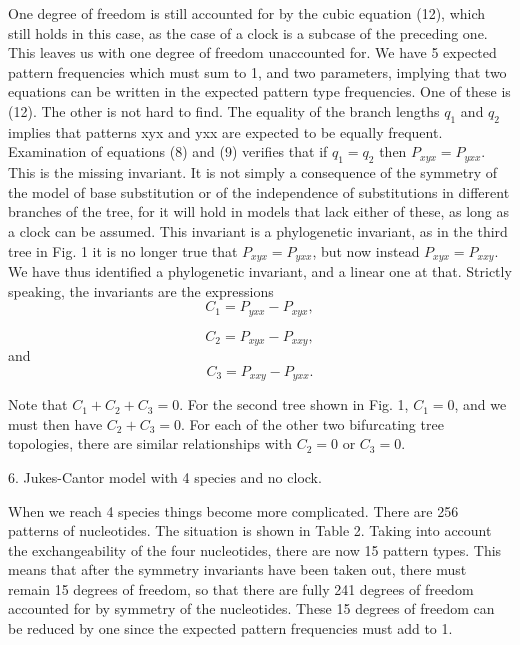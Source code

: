 One degree of freedom is still accounted for by the cubic equation (12),
which still holds in this case, as the case of a clock is a subcase of
the preceding one.  This leaves us with one degree of freedom unaccounted for.
We have 5 expected pattern frequencies which must sum to 1, and two parameters,
implying that two equations can be written in the expected pattern type
frequencies.  One of these is (12).  The other is not hard to find.  The
equality of the branch lengths $q_1$ and $q_2$ implies that patterns xyx and
yxx are expected to be equally frequent.  Examination of equations (8) and
(9) verifies that if $q_1 = q_2$ then $P_{xyx} = P_{yxx}$.
This is the missing invariant.  It is not simply a consequence of
the symmetry of
the model of base substitution or of the independence of substitutions in
different branches of the tree, for it will hold in models that lack either
of these, as long as a clock can be assumed.  This invariant is a phylogenetic invariant,
as in the third tree in Fig. 1 it is no longer true that $P_{xyx} = P_{yxx}$,
but now instead
$P_{xyx} = P_{xxy}$.  We have thus identified a phylogenetic invariant, and a
linear one at that.  Strictly speaking, the invariants are the expressions
\begin{equation} %
         C_1   =   P_{yxx} - P_{xyx},
\end{equation}

\begin{equation} %
         C_2   =   P_{xyx} - P_{xxy},
\end{equation}
and
\begin{equation} %
         C_3   =   P_{xxy} - P_{yxx}.
\end{equation}

Note that $C_1 + C_2 + C_3 = 0$.  For the second tree shown in Fig. 1,
$C_1 = 0$, and we must then have $C_2 + C_3 = 0$.  For each of the other two
bifurcating tree topologies, there are similar relationships with $C_2 = 0$ or
$C_3 = 0$.
\bigskip

\centerline{6.  Jukes-Cantor model with 4 species and no clock.}
\medskip

When we reach 4 species things become more complicated.
There are 256 patterns of nucleotides.  The situation is shown in Table
2.  Taking into account the
exchangeability of the four nucleotides, there are now 15 pattern types.  This
means that after the symmetry invariants have been taken out, there must
remain 15 degrees of freedom, so that there are fully 241 degrees of freedom
accounted for by symmetry of the nucleotides.  These 15 degrees of freedom can
be reduced by one since the expected pattern frequencies must add to 1.

